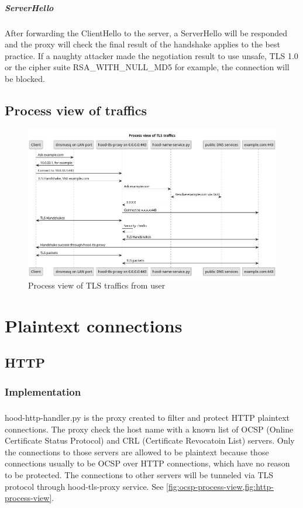 \documentclass[mscthesis]{usiinfthesis}
\begin{document}
\paragraph{ServerHello} After forwarding the ClientHello to the server, a ServerHello will be responded and the proxy will check the final result of the handshake applies to the best practice. If a naughty attacker made the negotiation result to use unsafe, TLS 1.0 or the cipher suite RSA\_WITH\_NULL\_MD5 for example, the connection will be blocked.


\section{Process view of traffics}
\begin{figure}[H]
  \includegraphics[width=\textheight, angle=90]{graphics/puml/process-tls-traffic.png}
  \caption{Process view of TLS traffics from user}
  \label{fig:tls-process-view}
\end{figure}

\chapter{Plaintext connections}

\section{HTTP}
\subsection{Implementation}
\paragraph{}
hood-http-handler.py is the proxy created to filter and protect HTTP plaintext connections. The proxy check the host name with a known list of OCSP (Online Certificate Status Protocol) and CRL (Certificate Revocatoin List) servers. Only the connections to those servers are allowed to be plaintext because those connections usually to be OCSP over HTTP connections, which have no reason to be protected. The connections to other servers will be tunneled via TLS protocol through hood-tls-proxy service. See \cref{fig:ocsp-process-view,fig:http-process-view}.
\end{document}
